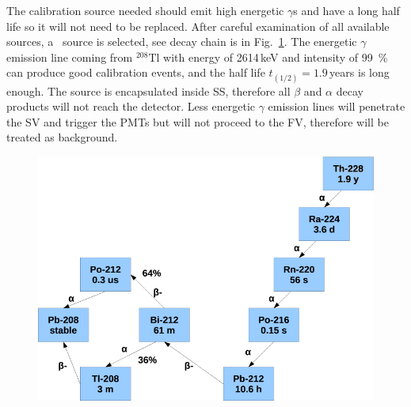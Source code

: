 The calibration source needed should emit high energetic $\gamma$s and have a long half life so it will not need to be replaced. After careful examination of all available sources, a \Th\ source is selected, see decay chain is in Fig.~\ref{fig:th228}. The energetic $\gamma$ emission line coming from $^{208}\mathrm{Tl}$ with energy of 2614\,keV and intensity of 99~\% can produce good calibration events, and the half life $t_(1/2)=1.9$\,years is long enough.
The source is encapsulated inside SS, therefore all $\beta$ and $\alpha$ decay products will not reach the detector. Less energetic $\gamma$ emission lines will penetrate the SV and trigger the PMTs but will not proceed to the FV, therefore will be treated as background.



\begin{figure}
	\begin{center}
	\includegraphics[height= 0.5\textheight]{figs/Th228Check.PNG}%
		\label{fig:th228}		
		\end{center}
	
	\end{figure} 
 
